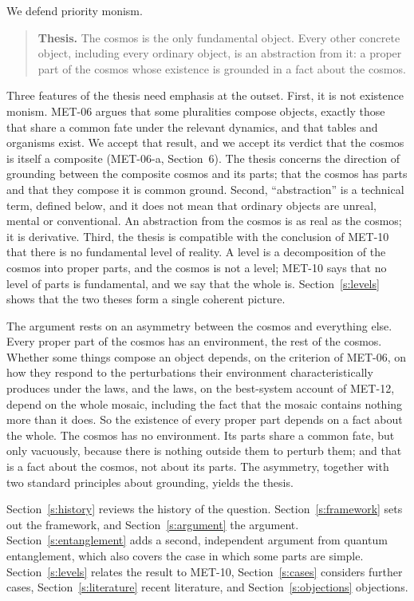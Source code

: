 \documentclass{situationist-preprint}
\begin{document}
We defend priority monism.

\begin{quote}
\textbf{Thesis.} The cosmos is the only fundamental object. Every other concrete object, including every ordinary object, is an abstraction from it: a proper part of the cosmos whose existence is grounded in a fact about the cosmos.
\end{quote}

Three features of the thesis need emphasis at the outset. First, it is not existence monism. MET-06 argues that some pluralities compose objects, exactly those that share a common fate under the relevant dynamics, and that tables and organisms exist. We accept that result, and we accept its verdict that the cosmos is itself a composite (MET-06-a, Section~6). The thesis concerns the direction of grounding between the composite cosmos and its parts; that the cosmos has parts and that they compose it is common ground. Second, \enquote{abstraction} is a technical term, defined below, and it does not mean that ordinary objects are unreal, mental or conventional. An abstraction from the cosmos is as real as the cosmos; it is derivative. Third, the thesis is compatible with the conclusion of MET-10 that there is no fundamental level of reality. A level is a decomposition of the cosmos into proper parts, and the cosmos is not a level; MET-10 says that no level of parts is fundamental, and we say that the whole is. Section~\ref{s:levels} shows that the two theses form a single coherent picture.

The argument rests on an asymmetry between the cosmos and everything else. Every proper part of the cosmos has an environment, the rest of the cosmos. Whether some things compose an object depends, on the criterion of MET-06, on how they respond to the perturbations their environment characteristically produces under the laws, and the laws, on the best-system account of MET-12, depend on the whole mosaic, including the fact that the mosaic contains nothing more than it does. So the existence of every proper part depends on a fact about the whole. The cosmos has no environment. Its parts share a common fate, but only vacuously, because there is nothing outside them to perturb them; and that is a fact about the cosmos, not about its parts. The asymmetry, together with two standard principles about grounding, yields the thesis.

Section~\ref{s:history} reviews the history of the question. Section~\ref{s:framework} sets out the framework, and Section~\ref{s:argument} the argument. Section~\ref{s:entanglement} adds a second, independent argument from quantum entanglement, which also covers the case in which some parts are simple. Section~\ref{s:levels} relates the result to MET-10, Section~\ref{s:cases} considers further cases, Section~\ref{s:literature} recent literature, and Section~\ref{s:objections} objections.
\end{document}
